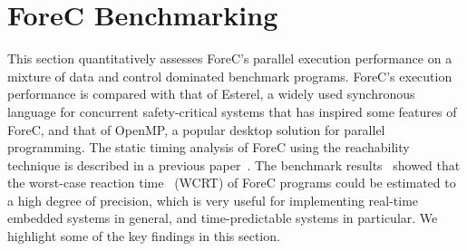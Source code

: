 \section{ForeC Benchmarking}
\label{sec:forec_benchmarking}
This section quantitatively assesses ForeC's parallel
execution performance on a mixture of data and control
dominated benchmark programs. ForeC's execution performance
is compared with that of Esterel, a widely used synchronous
language for concurrent safety-critical systems that has 
inspired some features of ForeC, and that of
OpenMP, a popular desktop solution for parallel programming.
The static timing analysis of ForeC using the reachability
technique is described in a previous paper~\cite{YipRAG13}. 
The benchmark results~\cite{YipRAG13} showed that the worst-case
reaction time~\cite{wcrt_concurrent_reactive} (WCRT) of 
ForeC programs could be estimated to a high degree of precision,
which is very useful for implementing real-time embedded systems in
general, and time-predictable systems in particular. 
We highlight some of the key findings in this section.


